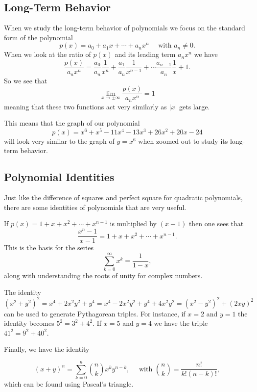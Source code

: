 \documentclass[
]{book}
\theoremstyle{definition}
\theoremstyle{definition}
\theoremstyle{definition}
\theoremstyle{definition}
\theoremstyle{remark}
\begin{document}
\hypertarget{long-term-behavior}{%
\subsection{Long-Term Behavior}\label{long-term-behavior}}

When we study the long-term behavior of polynomials we focus on the standard form of the polynomial
\[p(x)=a_0 + a_1 x + \cdots + a_n x^n \quad \mbox{ with } a_n\neq 0.\] When we look at the ratio of \(p(x)\) and its leading term \(a_n x^n\) we have \[\frac{p(x)}{a_n x^n} = \frac{a_0}{a_n} \frac{1}{x^n} + \frac{a_1}{a_n} \frac{1}{x^{n-1}} + \cdots \frac{a_{n-1}}{a_n} \frac{1}{x} + 1.\] So we see that \[\lim_{x \rightarrow \pm \infty} \frac{p(x)}{a_n x^n} =1\] meaning that these two functions act very similarly as \(|x|\) gets large.

This means that the graph of our polynomial \[p(x)=x^6+x^5-11x^4-13x^3+26x^2+20x-24\] will look very similar to the graph of \(y=x^6\) when zoomed out to study its long-term behavior.

\hypertarget{polynomial-identities-1}{%
\subsection{Polynomial Identities}\label{polynomial-identities-1}}

Just like the difference of squares and perfect square for quadratic polynomials, there are some identities of polynomials that are very useful.

If \(p(x)=1+x+x^2+\cdots + x^{n-1}\) is multiplied by \((x-1)\) then one sees that
\[\frac{x^n-1}{x-1} = 1+x+x^2+\cdots + x^{n-1}.\] This is the basis for the series
\[\sum_{k=0}^\infty x^k = \frac{1}{1-x},\] along with understanding the roots of unity for complex numbers.

The identity
\[(x^2+y^2)^2= x^4+2x^2y^2+y^4 = x^4-2x^2y^2+y^4+4x^2y^2 = (x^2-y^2)^2 + (2xy)^2\] can be used to generate Pythagorean triples. For instance, if \(x=2\) and \(y=1\) the identity becomes \(5^2=3^2+4^2\). If \(x=5\) and \(y=4\) we have the triple \(41^2=9^2+40^2\).

Finally, we have the identity

\[(x+y)^n = \sum_{k=0}^{n} \binom{n}{k} x^k y^{n-k}, \quad \mbox{ with } \binom{n}{k} = \frac{n!}{k!(n-k)!},\] which can be found using Pascal's triangle.
\end{document}
